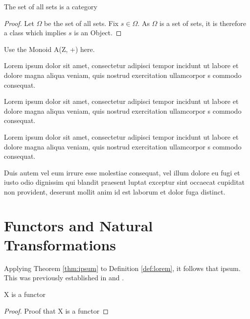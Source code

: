 \documentclass{article}
\begin{document}
\begin{theorem}
  The set of all sets is a category
\end{theorem}

\begin{proof}
Let $\Omega$ be the set of all sets. Fix $s\in \Omega$. As $\Omega$ is a set of sets, it is therefore a class which implies $s$ is an Object.
\end{proof}

\begin{example}
Use the Monoid A(Z, +) here.
\end{example}

Lorem ipsum dolor sit amet, consectetur adipisci tempor incidunt ut labore et dolore magna aliqua veniam, quis nostrud exercitation ullamcorpor s commodo consequat. 

\begin{definition}\label{def:lorem}
	Lorem ipsum dolor sit amet, consectetur adipisci tempor incidunt ut labore et dolore magna aliqua veniam, quis nostrud exercitation ullamcorpor s commodo consequat.
\end{definition}

Lorem ipsum dolor sit amet, consectetur adipisci tempor incidunt ut labore et dolore magna aliqua veniam, quis nostrud exercitation ullamcorpor s commodo consequat. 

\begin{theorem}\label{thm:ipsum}
	Duis autem vel eum irrure esse molestiae consequat, vel illum dolore eu fugi et iusto odio dignissim qui blandit praesent luptat exceptur sint occaecat cupiditat non provident, deserunt mollit anim id est laborum et dolor fuga distinct.
\end{theorem}



\section{Functors and Natural Transformations}

Applying Theorem \ref{thm:ipsum} to Definition \ref{def:lorem}, it follows that ipsum. This was previously established in \cite{Gauss86} and \cite{Euclid02,Euclid03}.

\begin{theorem}
X is a functor
\end{theorem}
\begin{proof}
Proof that X is a functor
\end{proof}





\end{document}
